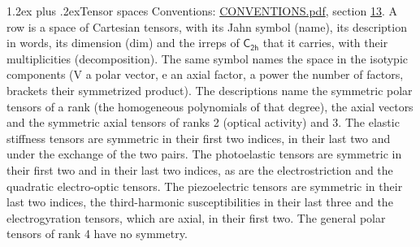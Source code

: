 \documentclass[10pt,a4paper]{article}
\makeatletter
\renewcommand\section{\@startsection{section}{1}{\z@}{-3ex plus -1ex minus -.2ex}%
  {1.2ex plus .2ex}{\normalfont\large\sffamily\bfseries\color{parttitle}}}
\numberwithin{equation}{section}
\newcommand{\grp}[1]{\mathsf{#1}}
\makeatother
\begin{document}
\section{Tensor spaces}\label{s:tensor_spaces}
Conventions: \href{../../CONVENTIONS.pdf}{CONVENTIONS.pdf}, section \href{../../CONVENTIONS.pdf\#conv.13}{13}.
\leavevmode\label{n:head.name}\label{n:head.description}\label{n:head.dim}\label{n:head.decomposition}A row is a space of Cartesian tensors, with its Jahn symbol (name), its description in words, its dimension (dim) and the irreps of $\grp{C_{2h}}$ that it carries, with their multiplicities (decomposition). \label{n:label.jahn}The same symbol names the space in the isotypic components (V a polar vector, e an axial factor, a power the number of factors, brackets their symmetrized product). The descriptions name the symmetric polar tensors of a rank (the homogeneous polynomials of that degree), the axial vectors and the symmetric axial tensors of ranks 2 (optical activity) and 3. The elastic stiffness tensors are symmetric in their first two indices, in their last two and under the exchange of the two pairs. The photoelastic tensors are symmetric in their first two and in their last two indices, as are the electrostriction and the quadratic electro-optic tensors. The piezoelectric tensors are symmetric in their last two indices, the third-harmonic susceptibilities in their last three and the electrogyration tensors, which are axial, in their first two. The general polar tensors of rank 4 have no symmetry.
\end{document}
